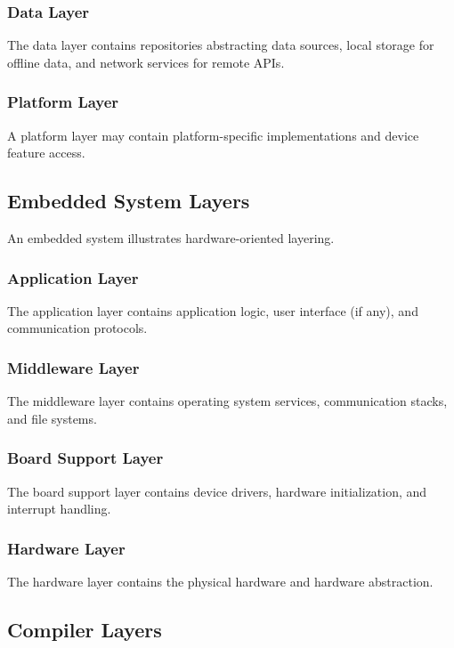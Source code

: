 \documentclass[11pt]{article}
\begin{document}
\subsubsection{Data Layer}

The data layer contains repositories abstracting data sources, local storage for offline data, and network services for remote APIs.

\subsubsection{Platform Layer}

A platform layer may contain platform-specific implementations and device feature access.

\subsection{Embedded System Layers}

An embedded system illustrates hardware-oriented layering.

\subsubsection{Application Layer}

The application layer contains application logic, user interface (if any), and communication protocols.

\subsubsection{Middleware Layer}

The middleware layer contains operating system services, communication stacks, and file systems.

\subsubsection{Board Support Layer}

The board support layer contains device drivers, hardware initialization, and interrupt handling.

\subsubsection{Hardware Layer}

The hardware layer contains the physical hardware and hardware abstraction.

\subsection{Compiler Layers}
\end{document}
